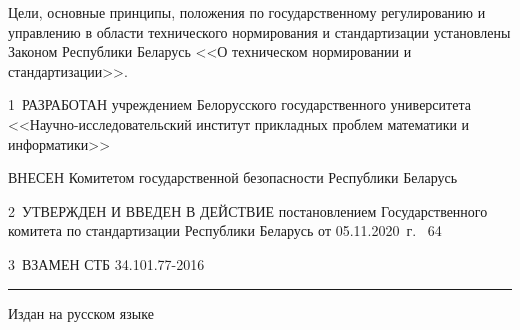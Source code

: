 Цели, основные принципы, положения по государственному регулированию и 
управлению в области технического нормирования и стандартизации 
установлены Законом Республики Беларусь <<О техническом нормировании и 
стандартизации>>.  

\vskip0.2cm

1~РАЗРАБОТАН учреждением Белорусского государственного университета 
<<Науч\-но-исследовательский институт прикладных проблем математики и 
информатики>> 

ВНЕСЕН Комитетом государственной безопасности Республики Беларусь

2~УТВЕРЖДЕН И ВВЕДЕН В ДЕЙСТВИЕ постановлением Государственного комитета 
по стандартизации Республики Беларусь от 05.11.2020~г. \No~64

3~ВЗАМЕН СТБ 34.101.77-2016

\vfill
\hrule
\vskip1mm
Издан на русском языке

\pagebreak
